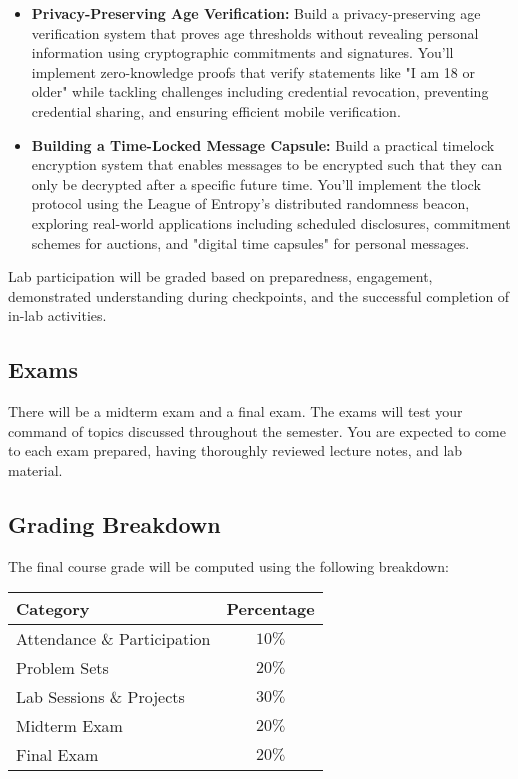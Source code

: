 \documentclass[10pt,a4paper,american]{exam}
\begin{document}
\begin{itemize}
	\item \textbf{Privacy-Preserving Age Verification:} Build a privacy-preserving age verification system that proves age thresholds without revealing personal information using cryptographic commitments and signatures. You'll implement zero-knowledge proofs that verify statements like "I am 18 or older" while tackling challenges including credential revocation, preventing credential sharing, and ensuring efficient mobile verification.
	\item \textbf{Building a Time-Locked Message Capsule:} Build a practical timelock encryption system that enables messages to be encrypted such that they can only be decrypted after a specific future time. You'll implement the tlock protocol using the League of Entropy's distributed randomness beacon, exploring real-world applications including scheduled disclosures, commitment schemes for auctions, and "digital time capsules" for personal messages.
\end{itemize}

Lab participation will be graded based on preparedness, engagement, demonstrated understanding during checkpoints, and the successful completion of in-lab activities.

\subsection{Exams}
There will be a midterm exam and a final exam. The exams will test your command of topics discussed throughout the semester. You are expected to come to each exam prepared, having thoroughly reviewed lecture notes, and lab material.

\subsection{Grading Breakdown}
The final course grade will be computed using the following breakdown:

\begin{center}
	\renewcommand{\arraystretch}{2}
	\begin{tabular}{|p{2.5in}|c|}
		\hline
		\textbf{Category}           & \textbf{Percentage} \\
		\hline
		Attendance \& Participation & $10\%$              \\
		\hline
		Problem Sets                & $20\%$              \\
		\hline
		Lab Sessions \& Projects    & $30\%$              \\
		\hline
		Midterm Exam                & $20\%$              \\
		\hline
		Final Exam                  & $20\%$              \\
		\hline
	\end{tabular}
\end{center}
\end{document}
